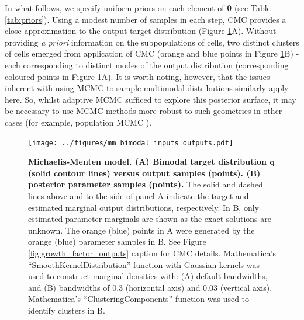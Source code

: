 %
In what follows, we specify uniform priors on each element of $\boldsymbol{\theta}$ (see Table \ref{tab:priors}). Using a modest number of samples in each step, CMC provides a close approximation to the output target distribution (Figure \ref{fig:mm_bimodal_inputs_outputs}A). Without providing \textit{a priori} information on the subpopulations of cells, two distinct clusters of cells emerged from application of CMC (orange and blue points in Figure \ref{fig:mm_bimodal_inputs_outputs}B) - each corresponding to distinct modes of the output distribution (corresponding coloured points in Figure \ref{fig:mm_bimodal_inputs_outputs}A). It is worth noting, however, that the issues inherent with using MCMC to sample multimodal distributions similarly apply here. So, whilst adaptive MCMC \cite{johnstone2016uncertainty} sufficed to explore this posterior surface, it may be necessary to use MCMC methods more robust to such geometries in other cases (for example, population MCMC \cite{jasra2007population}).

\begin{figure}[H]
\centerline{\texttt{[image: ../figures/mm\_bimodal\_inputs\_outputs.pdf]}}
\caption{\textbf{Michaelis-Menten model. (A) Bimodal target distribution $\boldsymbol{q}$ (solid contour lines) versus output samples (points). (B) posterior parameter samples (points).} The solid and dashed lines above and to the side of panel A indicate the target and estimated marginal output distributions, respectively. In B, only estimated parameter marginals are shown as the exact solutions are unknown. The orange (blue) points in A were generated by the orange (blue) parameter samples in B. See Figure \ref{fig:growth_factor_outputs} caption for CMC details. Mathematica's ``SmoothKernelDistribution'' function \cite{mathematica} with Gaussian kernels was used to construct marginal densities with: (A) default bandwidths, and (B) bandwidths of 0.3 (horizontal axis) and 0.03 (vertical axis). Mathematica's ``ClusteringComponents'' function \cite{mathematica} was used to identify clusters
in B.}
\label{fig:mm_bimodal_inputs_outputs}
\end{figure}


